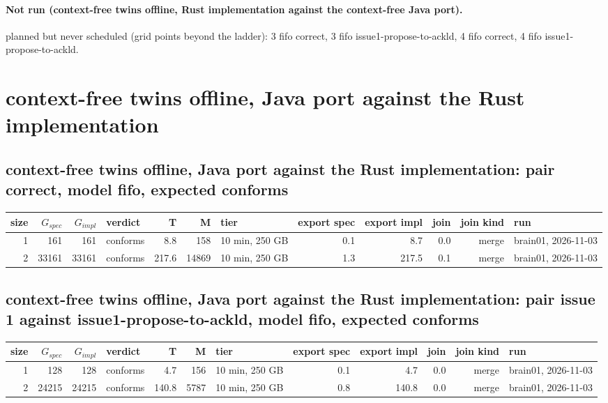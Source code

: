 \documentclass[10pt]{article}
\begin{document}
\paragraph{Not run (context-free twins offline, Rust implementation against the context-free Java port).}
planned but never scheduled (grid points beyond the ladder): 3 fifo correct, 3 fifo issue1-propose-to-ackld, 4 fifo correct, 4 fifo issue1-propose-to-ackld.\par
\section*{context-free twins offline, Java port against the Rust implementation}
\subsection*{context-free twins offline, Java port against the Rust implementation: pair \textsf{correct}, model fifo, expected conforms}
\begin{longtable}{@{}rrrlrrlrrrrl@{}}
\toprule
size & $G_{\mathit{spec}}$ & $G_{\mathit{impl}}$ & verdict & T & M & tier & export spec & export impl & join & join kind & run \\
\midrule
\endhead
\color{blue} 1 & 161 & 161 & conforms & 8.8 & 158 & 10 min, 250 GB & 0.1 & 8.7 & 0.0 & merge & brain01, 2026-11-03 \\
\color{blue} 2 & 33161 & 33161 & conforms & 217.6 & 14869 & 10 min, 250 GB & 1.3 & 217.5 & 0.1 & merge & brain01, 2026-11-03 \\
\bottomrule
\end{longtable}
\subsection*{context-free twins offline, Java port against the Rust implementation: pair \textsf{issue 1} against \textsf{issue1-propose-to-ackld}, model fifo, expected conforms}
\begin{longtable}{@{}rrrlrrlrrrrl@{}}
\toprule
size & $G_{\mathit{spec}}$ & $G_{\mathit{impl}}$ & verdict & T & M & tier & export spec & export impl & join & join kind & run \\
\midrule
\endhead
\color{blue} 1 & 128 & 128 & conforms & 4.7 & 156 & 10 min, 250 GB & 0.1 & 4.7 & 0.0 & merge & brain01, 2026-11-03 \\
\color{blue} 2 & 24215 & 24215 & conforms & 140.8 & 5787 & 10 min, 250 GB & 0.8 & 140.8 & 0.0 & merge & brain01, 2026-11-03 \\
\bottomrule
\end{longtable}
\end{document}
